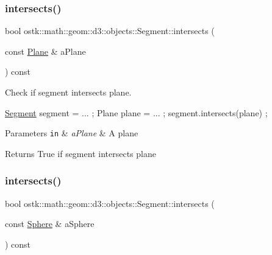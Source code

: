 \subsubsection{\texorpdfstring{intersects()}{intersects()}\hspace{0.1cm}{\footnotesize\ttfamily [1/3]}}
{\footnotesize\ttfamily bool ostk\+::math\+::geom\+::d3\+::objects\+::\+Segment\+::intersects (\begin{DoxyParamCaption}\item[{const \hyperlink{classostk_1_1math_1_1geom_1_1d3_1_1objects_1_1_plane}{Plane} \&}]{a\+Plane }\end{DoxyParamCaption}) const}



Check if segment intersects plane. 


\begin{DoxyCode}
\hyperlink{classostk_1_1math_1_1geom_1_1d3_1_1objects_1_1_segment_aa2cb60ce06335a5f76120c658219494c}{Segment} segment = ... ;
Plane plane = ... ;
segment.intersects(plane) ;
\end{DoxyCode}



\begin{DoxyParams}[1]{Parameters}
\mbox{\tt in}  & {\em a\+Plane} & A plane \\
\hline
\end{DoxyParams}
\begin{DoxyReturn}{Returns}
True if segment intersects plane 
\end{DoxyReturn}
\mbox{\label{classostk_1_1math_1_1geom_1_1d3_1_1objects_1_1_segment_a89ca3e575e43516435d8b3f6f5a6c624}} 
\subsubsection{\texorpdfstring{intersects()}{intersects()}\hspace{0.1cm}{\footnotesize\ttfamily [2/3]}}
{\footnotesize\ttfamily bool ostk\+::math\+::geom\+::d3\+::objects\+::\+Segment\+::intersects (\begin{DoxyParamCaption}\item[{const \hyperlink{classostk_1_1math_1_1geom_1_1d3_1_1objects_1_1_sphere}{Sphere} \&}]{a\+Sphere }\end{DoxyParamCaption}) const}



